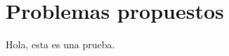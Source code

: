 \section{\large Problemas propuestos}

\begin{problem}

\end{problem}
\begin{lemma}
    Hola, esta es una prueba.
\end{lemma}
